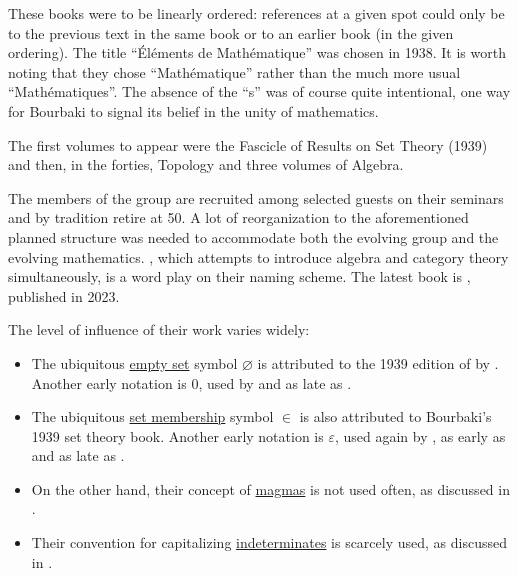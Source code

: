 \begin{remark}
\begin{displayquote}
    These books were to be linearly ordered: references at a given spot could only be to the previous text in the same book or to an earlier book (in the given ordering). The title \enquote{\'El\'ements de Math\'ematique} was chosen in 1938. It is worth noting that they chose \enquote{Math\'ematique} rather than the much more usual \enquote{Math\'ematiques}. The absence of the \enquote{s} was of course quite intentional, one way for Bourbaki to signal its belief in the unity of mathematics.

    The first volumes to appear were the Fascicle of Results on Set Theory (1939) and then, in the forties, Topology and three volumes of Algebra.
  \end{displayquote}

  The members of the group are recruited among selected guests on their seminars and by tradition retire at 50. A lot of reorganization to the aforementioned planned structure was needed to accommodate both the evolving group and the evolving mathematics. , which attempts to introduce algebra and category theory simultaneously, is a word play on their naming scheme. The latest book is \cite{Bourbaki2023ThéoriesSpectrales3à5}, published in 2023.

  The level of influence of their work varies widely:
  \begin{itemize}
    \item The ubiquitous \hyperref[def:empty_set]{empty set} symbol \( \varnothing \) is attributed to the 1939 edition of \cite[E II.1]{Bourbaki1970ThéorieDesEnsembles} by \cite{Miller2019EarliestUsesOfLogicSymbols}. Another early notation is \( 0 \), used by  and as late as .

    \item The ubiquitous \hyperref[def:naive_set_theory]{set membership} symbol \( {\in} \) is also attributed to Bourbaki's 1939 set theory book. Another early notation is \( \varepsilon \), used again by , as early as  and as late as .

    \item On the other hand, their concept of \hyperref[rem:magma_terminology]{magmas} is not used often, as discussed in .

    \item Their convention for capitalizing \hyperref[con:indeterminate]{indeterminates} is scarcely used, as discussed in .
  \end{itemize}


\end{remark}
